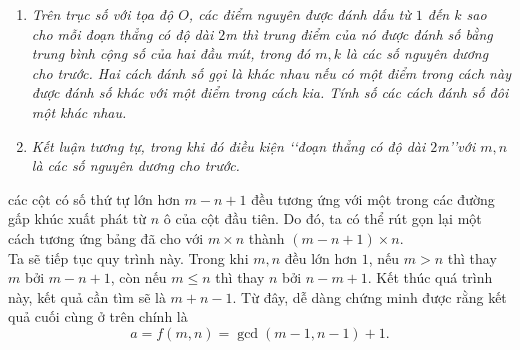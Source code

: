 \begin{vd}\hspace{5cm}
\begin{enumerate}
\item \textit{Trên trục số với tọa độ $O$, các điểm nguyên được đánh dấu từ $1$ đến $k$ sao cho mỗi đoạn thẳng có độ dài $2$m thì trung điểm của nó được đánh số bằng trung bình cộng số của hai đầu mút, trong đó $m, k$ là các số nguyên dương cho trước. Hai cách đánh số gọi là khác nhau nếu có một điểm trong cách này được đánh số khác với một điểm trong cách kia. Tính số các cách đánh số đôi một khác nhau.}
\item \textit{Kết luận tương tự, trong khi đó điều kiện \lq\lq đoạn thẳng có độ dài $2$m\rq\rq với $m,n$ là các số nguyên dương cho trước.}
\end{enumerate}
\end{vd}
các cột có số thứ tự lớn hơn $m-n+1$ đều tương ứng với một trong các đường gấp khúc xuất phát từ $n$ ô của cột đầu tiên. 
Do đó, ta có thể rút gọn lại một cách tương ứng bảng đã cho với $m \times n$ thành $(m-n+1)\times n$.\\
Ta sẽ tiếp tục quy trình này. Trong khi $m,n$ đều lớn hơn $1$, nếu $m>n$ thì thay $m$ bởi $m-n+1$, còn nếu $m \le n$ thì thay $n$ bởi $n-m+1$. Kết thúc quá trình này, kết quả cần tìm sẽ là $m+n-1$. Từ đây, dễ dàng chứng minh được rằng kết quả cuối cùng ở trên chính là 
$$a=f \left( m,n \right) =\gcd \left(m-1,n-1\right)+1.$$ 

